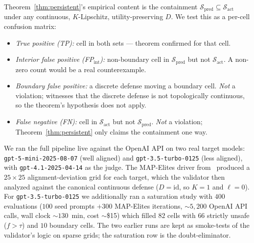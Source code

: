 \documentclass{article}
\begin{document}
Theorem~\ref{thm:persistent}'s empirical content is the
containment $\mathcal{S}_{\text{pred}} \subseteq \mathcal{S}_{\text{act}}$
under any continuous, $K$-Lipschitz, utility-preserving $D$. We test
this as a per-cell confusion matrix:

\begin{itemize}[nosep]
  \item \emph{True positive (TP):} cell in both sets — theorem
    confirmed for that cell.
  \item \emph{Interior false positive (FP$_{\mathrm{int}}$):} non-boundary
    cell in $\mathcal{S}_{\text{pred}}$ but not $\mathcal{S}_{\text{act}}$.
    A non-zero count would be a real counterexample.
  \item \emph{Boundary false positive:} a discrete defense moving a
    boundary cell. \emph{Not} a violation; witnesses that the discrete
    defense is not topologically continuous, so the theorem's
    hypothesis does not apply.
  \item \emph{False negative (FN):} cell in $\mathcal{S}_{\text{act}}$
    but not $\mathcal{S}_{\text{pred}}$. \emph{Not} a violation;
    Theorem~\ref{thm:persistent} only claims the containment one way.
\end{itemize}

We ran the full pipeline live against the OpenAI API on two real
target models: \texttt{gpt-5-mini-2025-08-07} (well aligned) and
\texttt{gpt-3.5-turbo-0125} (less aligned), with
\texttt{gpt-4.1-2025-04-14} as the judge. The MAP-Elites driver
from~\cite{munshi2026manifold} produced a $25 \times 25$
alignment-deviation grid for each target, which the validator then
analyzed against the canonical continuous defense
($D = \mathrm{id}$, so $K = 1$ and $\ell = 0$). For
\texttt{gpt-3.5-turbo-0125} we additionally ran a saturation study
with $400$ evaluations ($100$ seed prompts $+ 300$ MAP-Elites
iterations, $\sim$$5{,}200$ OpenAI API calls, wall clock
$\sim$$130$~min, cost $\sim$\$15) which filled $82$ cells with
$66$ strictly unsafe ($f > \tau$) and $10$ boundary cells. The
two earlier runs are kept as smoke-tests of the validator's logic
on sparse grids; the saturation row is the doubt-eliminator.
\end{document}
